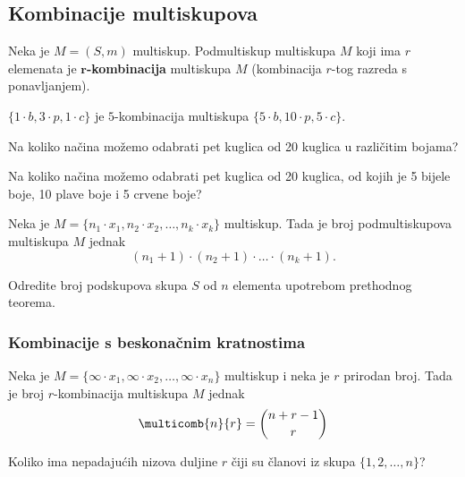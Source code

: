 \subsection{Kombinacije multiskupova}

Neka je $M = (S, m)$ multiskup.
Podmultiskup multiskupa $M$ koji ima $r$ elemenata je \textbf{$\mathbf{r}$-kombinacija} multiskupa $M$ (kombinacija $r$-tog razreda s ponavljanjem).

\begin{example}
    $\{1 \cdot b, 3 \cdot p, 1 \cdot c\}$ je $5$-kombinacija multiskupa $\{5
    \cdot b, 10 \cdot p, 5 \cdot c\}$.
\end{example}

\begin{example}
    Na koliko načina možemo odabrati pet kuglica od 20 kuglica u različitim
    bojama?
\end{example}

\begin{example}
    Na koliko načina možemo odabrati pet kuglica od 20 kuglica, od kojih je 5
    bijele boje, 10 plave boje i 5 crvene boje?
\end{example}

\begin{theorem}
    Neka je $M = \{n_1 \cdot x_1, n_2 \cdot x_2, \dots, n_k \cdot x_k\}$
    multiskup. Tada je broj podmultiskupova multiskupa $M$ jednak
    $$
        (n_1 + 1) \cdot (n_2 + 1) \cdot \dots \cdot (n_k + 1).
    $$
\end{theorem}

\begin{example}
    Odredite broj podskupova skupa $S$ od $n$ elementa upotrebom prethodnog
    teorema.
\end{example}

\subsubsection{Kombinacije s beskonačnim kratnostima}

\begin{theorem}
    Neka je $M=\{\infty \cdot x_1, \infty \cdot x_2, \dots, \infty \cdot x_n\}$
    multiskup i neka je $r$ prirodan broj. Tada je broj $r$-kombinacija
    multiskupa $M$ jednak
    $$
        \multicomb{n}{r} = \binom{n + r - 1}{r}
    $$
\end{theorem}

\begin{example}
    Koliko ima nepadajućih nizova duljine $r$ čiji su članovi iz skupa
    $\{1,2,\dots,n\}$?
\end{example}

